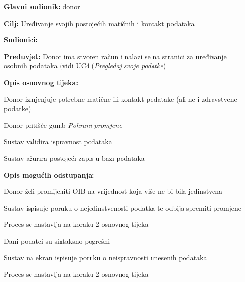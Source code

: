					
					\noindent {}
					\begin{packed_item} \label{UC5}
	
						\item \textbf{Glavni sudionik: }donor
						\item  \textbf{Cilj:} Uređivanje svojih postojećih matičnih i kontakt podataka
						\item  \textbf{Sudionici:} 
						\item  \textbf{Preduvjet: }Donor ima stvoren račun i nalazi se na stranici za uređivanje osobnih podataka (vidi \hyperref[UC4]{UC4 (\textit{Pregledaj svoje podatke})}
						\item  \textbf{Opis osnovnog tijeka:}
						
						\item[] \begin{packed_enum}
	                        \item Donor izmjenjuje potrebne matične ili kontakt podatake (ali ne i zdravstvene podatke)
	                        \item Donor pritišće gumb \textit{Pohrani promjene}
	                        \item Sustav validira ispravnost podataka
	                        \item Sustav ažurira postojeći zapis u bazi podataka
	                        
						\end{packed_enum}
						
						\item  \textbf{Opis mogućih odstupanja:}
						
						\item[] \begin{packed_item}
	
							\item[4.a] Donor želi promijeniti OIB na vrijednost koja više ne bi bila jedinstvena
							\begin{packed_enum}
								\item Sustav ispisuje poruku o nejedinstvenosti podatka te odbija spremiti promjene
								\item Proces se nastavlja na koraku 2 osnovnog tijeka
							\end{packed_enum}
							
							\item[4.b] Dani podatci su sintaksno pogrešni
							\begin{packed_enum}
								\item Sustav na ekran ispisuje poruku o neispravnosti unesenih podataka
								\item Proces se nastavlja na koraku 2 osnovnog tijeka
							\end{packed_enum}
							
						\end{packed_item}
						
					\end{packed_item}
					

